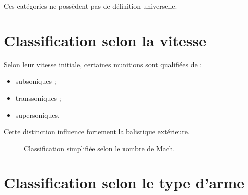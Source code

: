 Ces catégories ne possèdent pas de définition universelle.

\section{Classification selon la vitesse}

Selon leur vitesse initiale, certaines munitions sont qualifiées de :

\begin{itemize}
    \item subsoniques ;
    \item transsoniques ;
    \item supersoniques.
\end{itemize}

Cette distinction influence fortement la balistique extérieure.

\begin{figure}[htbp]
\centering


\caption{Classification simplifiée selon le nombre de Mach.}
\label{fig:classification_vitesse}

\end{figure}

\section{Classification selon le type d'arme}

